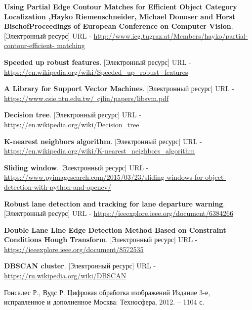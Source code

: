 \begin{thebibliography}{2}
	\textbf{Using Partial Edge Contour Matches for Efficient Object Category
		Localization ,Hayko Riemenschneider, Michael Donoser and Horst
		BischofProceedings of European Conference on Computer Vision}. [Электронный ресурс] URL - 
	\href{http://www.icg.tugraz.at/Members/hayko/partial-contour-efficient-
		matching}{http://www.icg.tugraz.at/Members/hayko/partial-contour-efficient-
		matching}
	
	\textbf{Speeded up robust features}. [Электронный ресурс] URL - 
	\href{https://en.wikipedia.org/wiki/Speeded\_up_robust\_features}{https://en.wikipedia.org/wiki/Speeded\_up\_robust\_features}
	
	\textbf{A Library for Support Vector Machines}. [Электронный ресурс] URL - 
	\href{https://www.csie.ntu.edu.tw/~cjlin/papers/libsvm.pdf}{https://www.csie.ntu.edu.tw/~cjlin/papers/libsvm.pdf}
	
	\textbf{Decision tree}. [Электронный ресурс] URL - 
	\href{https://en.wikipedia.org/wiki/Decision\_tree}{https://en.wikipedia.org/wiki/Decision\_tree}
	
	\textbf{K-nearest neighbors algorithm}. [Электронный ресурс] URL - 
	\href{https://en.wikipedia.org/wiki/K-nearest\_neighbors\_algorithm}{https://en.wikipedia.org/wiki/K-nearest\_neighbors\_algorithm}
	
	\textbf{Sliding window}. [Электронный ресурс] URL - 
	\href{https://www.pyimagesearch.com/2015/03/23/sliding-windows-for-object-detection-with-python-and-opencv/}{https://www.pyimagesearch.com/2015/03/23/sliding-windows-for-object-detection-with-python-and-opencv/}
	
	\textbf{Robust lane detection and tracking for lane departure warning}. [Электронный ресурс] URL - 
	\href{https://ieeexplore.ieee.org/document/6384266}{https://ieeexplore.ieee.org/document/6384266}
	
	\textbf{Double Lane Line Edge Detection Method Based on
		Constraint Conditions Hough Transform}. [Электронный ресурс] URL - 
	\href{https://ieeexplore.ieee.org/document/8572535}{https://ieeexplore.ieee.org/document/8572535}
	
	\textbf{DBSCAN cluster}. [Электронный ресурс] URL - 
	\href{https://ru.wikipedia.org/wiki/DBSCAN}{https://ru.wikipedia.org/wiki/DBSCAN}
	
	Гонсалес Р., Вудс Р.
	Цифровая обработка изображений
	Издание 3-е, исправленное и дополненное
	Москва: Техносфера, 2012. – 1104 с. 
	

\end{thebibliography}
